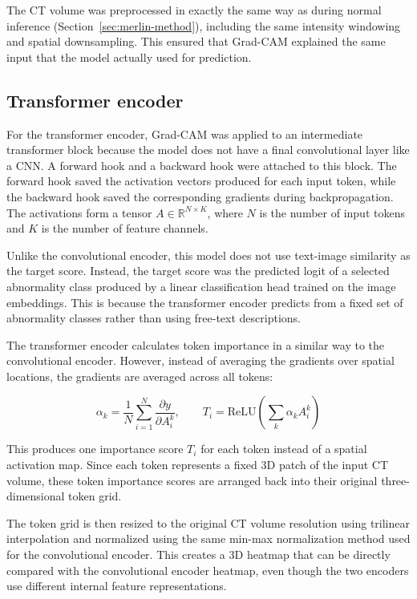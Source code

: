 The CT volume was preprocessed in exactly the same way as during normal
inference (Section~\ref{sec:merlin-method}), including the same intensity
windowing and spatial downsampling. This ensured that Grad-CAM explained the
same input that the model actually used for prediction.

\subsection{Transformer encoder}

For the transformer encoder, Grad-CAM was applied to an intermediate
transformer block because the model does not have a final convolutional
layer like a CNN. A forward hook and a backward hook were attached to this
block. The forward hook saved the activation vectors produced for each
input token, while the backward hook saved the corresponding gradients
during backpropagation. The activations form a tensor
$A \in \mathbb{R}^{N \times K}$, where $N$ is the number of input tokens and
$K$ is the number of feature channels.

Unlike the convolutional encoder, this model does not use text-image
similarity as the target score. Instead, the target score was the predicted
logit of a selected abnormality class produced by a linear classification
head trained on the image embeddings. This is because the transformer
encoder predicts from a fixed set of abnormality classes rather than using
free-text descriptions.

The transformer encoder calculates token importance in a similar way to the
convolutional encoder. However, instead of averaging the gradients over spatial
locations, the gradients are averaged across all tokens:

\begin{equation}[Token-Level Grad-CAM]
\alpha_{k} = \frac{1}{N}\sum_{i=1}^{N} \frac{\partial y}{\partial A_{i}^{k}},
\qquad
T_{i} = \mathrm{ReLU}\left(\sum_{k} \alpha_{k} A_{i}^{k}\right)
\end{equation}

This produces one importance score $T_i$ for each token instead of a spatial
activation map. Since each token represents a fixed 3D patch of the input CT
volume, these token importance scores are arranged back into their original
three-dimensional token grid.

The token grid is then resized to the original CT volume resolution using
trilinear interpolation and normalized using the same min-max normalization
method used for the convolutional encoder. This creates a 3D heatmap that can
be directly compared with the convolutional encoder heatmap, even though the
two encoders use different internal feature representations.

